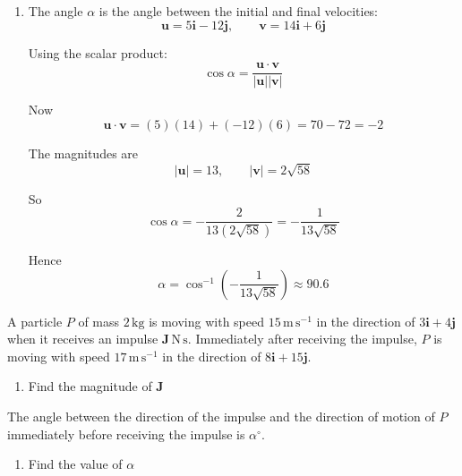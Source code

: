 \documentclass[leqno]{article}
\begin{document}
\begin{enumerate}[
  label=\textbf{\arabic*.},
  leftmargin=*,
  topsep=0pt,
  partopsep=0pt,
  parsep=0pt
]
\begin{djsSolution}
\begin{enumerate}[label=\textbf{(\alph*)}]
  So the speed immediately after the impulse is
  \[
  |\mathbf{v}|=\sqrt{14^2+6^2}
  =\sqrt{196+36}
  =\sqrt{232}
  =2\sqrt{58}
  \]

  Therefore the speed is $2\sqrt{58}\,\mathrm{m\,s^{-1}}\approx 15.2\,\mathrm{m\,s^{-1}}$.

  \item The angle $\alpha$ is the angle between the initial and final velocities:
  \[
  \mathbf{u}=5\mathbf{i}-12\mathbf{j},
  \qquad
  \mathbf{v}=14\mathbf{i}+6\mathbf{j}
  \]

  Using the scalar product:
  \[
  \cos\alpha=\frac{\mathbf{u}\cdot\mathbf{v}}{|\mathbf{u}||\mathbf{v}|}
  \]

  Now
  \[
  \mathbf{u}\cdot\mathbf{v}=(5)(14)+(-12)(6)=70-72=-2
  \]

  The magnitudes are
  \[
  |\mathbf{u}|=13,
  \qquad
  |\mathbf{v}|=2\sqrt{58}
  \]

  So
  \[
  \cos\alpha=-\frac{2}{13(2\sqrt{58})}=-\frac{1}{13\sqrt{58}}
  \]

  Hence
  \[
  \alpha=\cos^{-1}\left(-\frac{1}{13\sqrt{58}}\right)\approx 90.6
  \]

\end{enumerate}
\end{djsSolution}


\newpage

\questionitem

A particle $P$ of mass $2\,\mathrm{kg}$ is moving with speed $15\,\mathrm{m\,s^{-1}}$ in the direction of $3\mathbf{i}+4\mathbf{j}$ when it receives an impulse $\mathbf{J}\,\mathrm{N\,s}$. Immediately after receiving the impulse, $P$ is moving with speed $17\,\mathrm{m\,s^{-1}}$ in the direction of $8\mathbf{i}+15\mathbf{j}$. \\

\begin{enumerate}[label=\textbf{(\alph*)}]
  \item Find the magnitude of $\mathbf{J}$  \\
\end{enumerate}
The angle between the direction of the impulse and the direction of motion of $P$ immediately before receiving the impulse is $\alpha^\circ$. \\
\begin{enumerate}[label=\textbf{(\alph*)}, resume]
  \item Find the value of $\alpha$  \\
\end{enumerate}


\end{enumerate}
\end{document}
